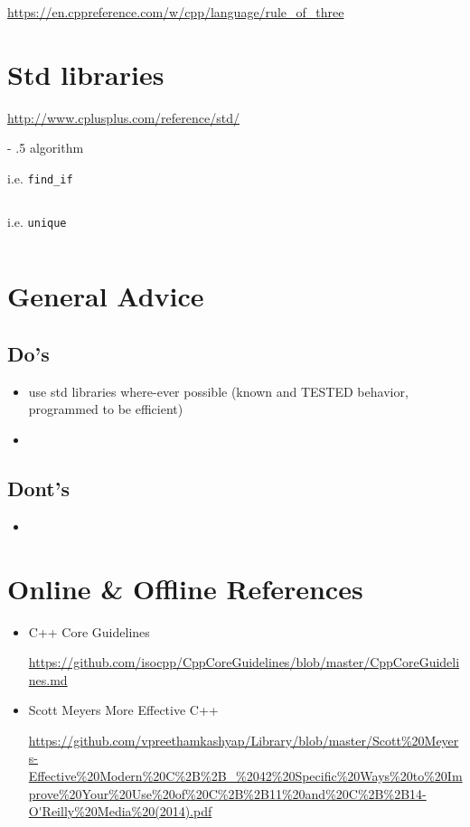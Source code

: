 \documentclass[
10pt,
a4paper,
parskip=half,	%
DIV=0,			%
BCOR=10mm
]{scrartcl}
\makeatletter
\renewcommand\paragraph{%
	\@startsection{paragraph}{4}{0mm}%
	{-\baselineskip}%
	{.5\baselineskip}%
	{\normalfont\normalsize\bfseries}}
\newcommand{\ttt}[1]{\texttt{#1}}
\makeatother
\begin{document}
	\url{https://en.cppreference.com/w/cpp/language/rule_of_three}
	

\section{Std libraries}
	
	\url{http://www.cplusplus.com/reference/std/}
	
	\paragraph{algorithm}
	
	i.e. \ttt{find\_if}
	\inputminted{cpp}{src/algorithm/ex-1/main.cpp}
	
	i.e. \ttt{unique}
	\inputminted{cpp}{src/algorithm/ex-2/main.cpp}
	
	
\section{General Advice}

\subsection{Do's}
\begin{itemize}
	\item use std libraries where-ever possible (known and TESTED behavior, programmed to be efficient)
	\item 
\end{itemize}

\subsection{Dont's}
\begin{itemize}
	\item 
\end{itemize}

\section{Online \& Offline References}

	\begin{itemize}
		\item C++ Core Guidelines 
		
		\url{https://github.com/isocpp/CppCoreGuidelines/blob/master/CppCoreGuidelines.md}
		
		\item Scott Meyers More Effective C++
		
		\url{https://github.com/vpreethamkashyap/Library/blob/master/Scott%20Meyers-Effective%20Modern%20C%2B%2B_%2042%20Specific%20Ways%20to%20Improve%20Your%20Use%20of%20C%2B%2B11%20and%20C%2B%2B14-O'Reilly%20Media%20(2014).pdf}
	\end{itemize}
	
\end{document}
